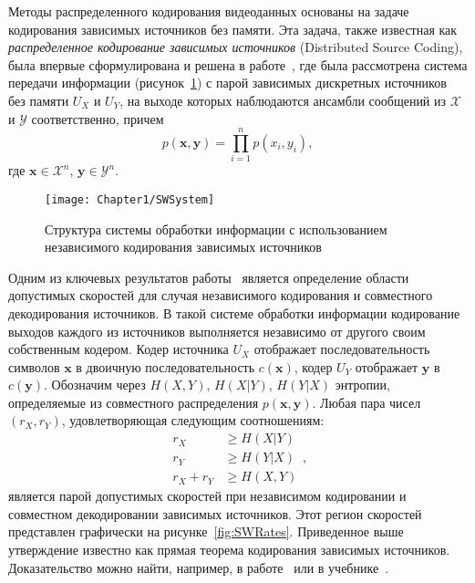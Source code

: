 Методы распределенного кодирования видеоданных основаны на задаче кодирования зависимых источников без памяти. Эта задача, также известная как \emph{распределенное кодирование зависимых источников} (Distributed Source Coding), была впервые сформулирована и решена в работе~\cite{Slepian1973}, где была рассмотрена система передачи информации (рисунок~\ref{fig:SWSystem}) с парой зависимых дискретных источников без памяти $U_X$ и $U_Y$, на выходе которых наблюдаются ансамбли сообщений из $\mathcal{X}$ и $\mathcal{Y}$ соответственно, причем
\begin{equation*}
p(\mathbf{x},\mathbf{y}) = \prod\limits_{i=1}^{n} p(x_i,y_i),
\end{equation*}
где $\mathbf{x} \in \mathcal{X}^n$, $\mathbf{y} \in \mathcal{Y}^n$.

\begin{figure}[htbp]
\begin{center}
\texttt{[image: Chapter1/SWSystem]}
\caption{Структура системы обработки информации с использованием независимого кодирования зависимых источников}
\label{fig:SWSystem}
\end{center}
\end{figure}

Одним из ключевых результатов работы~\cite{Slepian1973} является определение области допустимых скоростей для случая независимого кодирования и совместного декодирования источников. В такой системе обработки информации кодирование выходов каждого из источников выполняется независимо от другого своим собственным кодером. Кодер источника $U_X$ отображает последовательность символов $\mathbf{x}$ в двоичную последовательность $c(\mathbf{x})$, кодер $U_Y$ отображает $\mathbf{y}$ в $c(\mathbf{y})$. Обозначим через $H(X,Y)$, $H(X \vert Y)$, $H(Y \vert X)$  энтропии, определяемые из совместного распределения $p(\mathbf{x},\mathbf{y})$. Любая пара чисел $(r_X,r_Y)$, удовлетворяющая следующим соотношениям:
\begin{equation*}
\begin{split}
r_X & \geq H(X \vert Y) \\
r_Y & \geq H(Y \vert X) \\
r_X + r_Y & \geq H(X,Y)
\end{split},
\label{eq:SWRate}
\end{equation*}
является парой допустимых скоростей при независимом кодировании и совместном декодировании зависимых источников. Этот регион скоростей представлен графически на рисунке~\ref{fig:SWRates}. Приведенное выше утверждение известно как прямая теорема кодирования зависимых источников. Доказательство можно найти, например, в работе~\cite{Slepian1973} или в учебнике~\cite{Kolesnik}.

